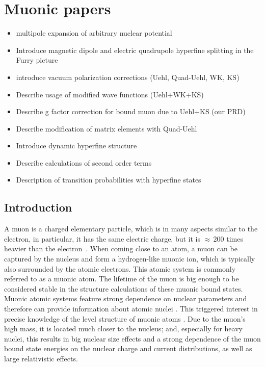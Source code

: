 \chapter{Muonic papers}

\begin{itemize}
\item multipole expansion of arbitrary nuclear potential
\item Introduce magnetic dipole and electric quadrupole hyperfine splitting in the Furry picture
\item introduce vacuum polarization corrections (Uehl, Quad-Uehl, WK, KS)
\item Describe usage of modified wave functions (Uehl+WK+KS)
\item Describe g factor correction for bound muon due to Uehl+KS (our PRD)
\item Describe modification of matrix elements with Quad-Uehl
\item Introduce dynamic hyperfine structure
\item Describe calculations of second order terms
\item Description of transition probabilities with hyperfine states
\end{itemize} 


\section{Introduction}
A muon is a charged elementary particle, which is in many aspects similar to the electron, in particular, it has the same electric charge, but it is ${\approx}\,{200}$ times heavier than the electron~\cite{codata}. When coming close to an atom, a muon can be captured by the nucleus and form a hydrogen-like muonic ion, which is typically also surrounded by the atomic electrons. This atomic system is commonly referred to as a muonic atom. The lifetime of the muon is big enough to be considered stable in the structure calculations of these muonic bound states. Muonic atomic systems feature strong dependence on nuclear parameters and therefore can provide information about atomic nuclei \cite{Wheeler1949}. This triggered interest in precise knowledge of the level structure of muonic atoms \cite{BorieRinker1982,Devons1995}. Due to the muon's high mass, it is located much closer to the nucleus; and, especially for heavy nuclei, this results in big nuclear size effects and a strong dependence of the muon bound state energies on the nuclear charge and current distributions, as well as large relativistic effects.

